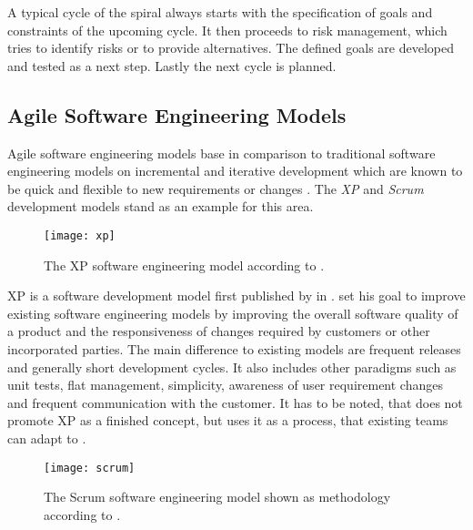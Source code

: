 A typical cycle of the spiral always starts with the specification of goals and
constraints of the upcoming cycle. It then proceeds to risk management, which
tries to identify risks or to provide alternatives. The defined goals are
developed and tested as a next step. Lastly the next cycle is planned.


\subsection{Agile Software Engineering Models} %

Agile software engineering models base in comparison to traditional software
engineering models on incremental and iterative development which are known to
be quick and flexible to new requirements or changes \cite{Beck1999}. The
\emph{\acl{XP}} and \emph{Scrum} development models stand as an example for
this area.

\begin{figure}[htbp]
  \centering
  \texttt{[image: xp]}
  \caption{The \acl{XP} software engineering model according to \textcite{Beck1999a}.}
\end{figure}

\ac{XP} is a software development model first published by
\citeauthor{Beck1999} \cite{Beck1999a} in \citeyear{Beck1999}.
\citeauthor{Beck1999} set his goal to improve existing software engineering
models by improving the overall software quality of a product and the
responsiveness of changes required by customers or other incorporated parties.
The main difference to existing models are frequent releases and generally
short development cycles. It also includes other paradigms such as unit tests,
flat management, simplicity, awareness of user requirement changes and frequent
communication with the customer. It has to be noted, that \citeauthor{Beck1999}
does not promote \acl{XP} as a finished concept, but uses it as a process, that
existing teams can adapt to \cite{Beck1999}.

\begin{figure}[htbp]
  \centering
  \texttt{[image: scrum]}
  \caption{The Scrum software engineering model shown as methodology according
    to \textcite{Schwaber1995}.}
\end{figure}

